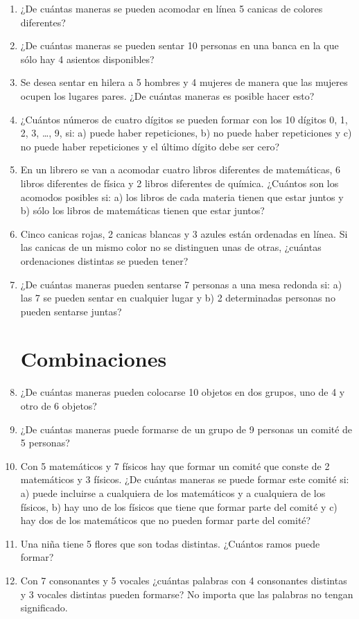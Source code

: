 \documentclass[10pt,twoside]{article}
\begin{document}
\begin{enumerate}
\item ¿De cuántas maneras se pueden acomodar en línea 5 canicas de colores diferentes?
\item ¿De cuántas maneras se pueden sentar 10 personas en una banca en la que sólo hay 4 asientos disponibles?
\item Se desea sentar en hilera a 5 hombres y 4 mujeres de manera que las mujeres ocupen los lugares pares. ¿De cuántas maneras es posible hacer esto?
\item ¿Cuántos números de cuatro dígitos se pueden formar con los 10 dígitos 0, 1, 2, 3, \ldots , 9, si: a) puede haber
repeticiones, b) no puede haber repeticiones y c) no puede haber repeticiones y el último dígito debe ser cero?
\item En un librero se van a acomodar cuatro libros diferentes de matemáticas, 6 libros diferentes de física y 2 libros diferentes de química. ¿Cuántos son los acomodos posibles si: a) los libros de cada materia tienen que estar juntos y b) sólo los libros de matemáticas tienen que estar juntos?
\item Cinco canicas rojas, 2 canicas blancas y 3 azules están ordenadas en línea. Si las canicas de un mismo color no se distinguen unas de otras, ¿cuántas ordenaciones distintas se pueden tener?
\item ¿De cuántas maneras pueden sentarse 7 personas a una mesa redonda si: a) las 7 se pueden sentar en cualquier lugar y b) 2 determinadas personas no pueden sentarse juntas?
\section*{Combinaciones}
\item ¿De cuántas maneras pueden colocarse 10 objetos en dos grupos, uno de 4 y otro de 6 objetos?
\item ¿De cuántas maneras puede formarse de un grupo de 9 personas un comité de 5 personas?
\item Con 5 matemáticos y 7 físicos hay que formar un comité que conste de 2 matemáticos y 3 físicos. ¿De cuántas maneras se puede formar este comité si: a) puede incluirse a cualquiera de los matemáticos y a cualquiera de los físicos, b) hay uno de los físicos que tiene que formar parte del comité y c) hay dos de los matemáticos que no pueden formar parte del comité?
\item Una niña tiene 5 flores que son todas distintas. ¿Cuántos ramos puede formar?
\item Con 7 consonantes y 5 vocales ¿cuántas palabras con 4 consonantes distintas y 3 vocales distintas pueden formarse? No importa que las palabras no tengan significado.

\end{enumerate}
\end{document}
